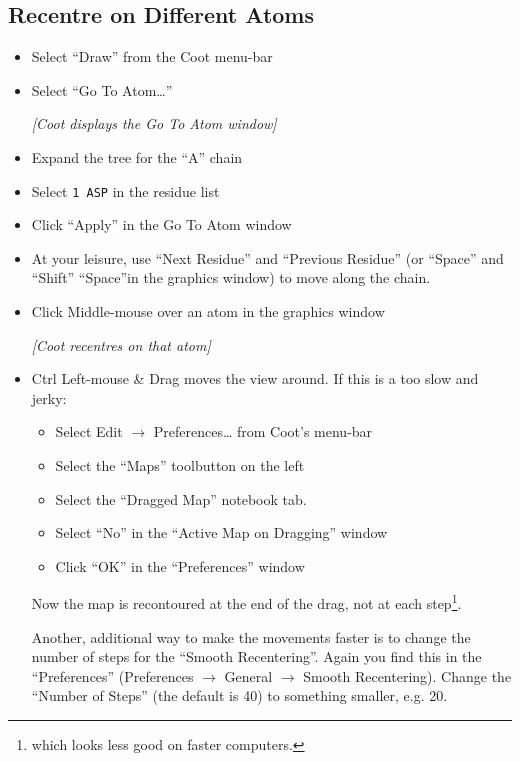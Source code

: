 \documentclass{article}
\begin{document}
\subsection {Recentre on Different Atoms}
\begin{itemize}
\item Select \textsf{``Draw''} from the Coot menu-bar
\item Select \textsf{``Go To Atom\ldots''}

\textsl{  [Coot displays the Go To Atom window]}

\item Expand the tree for the ``A'' chain
\item Select \texttt{1 ASP} in the residue list
\item Click \textsf{``Apply''} in the Go To Atom window
  
\item At your leisure, use \textsf{``Next Residue''} and
  \textsf{``Previous Residue''} (or ``Space'' and ``Shift''
  ``Space''in the graphics window) to move along the chain.


\item Click Middle-mouse over an atom in the graphics window

\textsl{[Coot recentres on that atom]}

\item Ctrl Left-mouse \& Drag moves the view around.  If this is a too
  slow and jerky:
  \begin{itemize}
  \item Select \textsf{Edit $\rightarrow$ Preferences\ldots} from Coot's menu-bar
  \item Select the \textsf{``Maps''} toolbutton on the left
  \item Select the \textsf{``Dragged Map''} notebook tab.
  \item Select \textsf{``No''} in the ``Active Map on Dragging'' window
  \item Click \textsf{``OK''} in the ``Preferences'' window
  \end{itemize}
  Now the map is recontoured at the end of the drag, not at each
  step\footnote{which looks less good on faster computers.}.

  Another, additional way to make the movements faster is to change the 
  number of steps for the ``Smooth Recentering''. Again you find this in
  the ``Preferences'' (\textsf{Preferences $\rightarrow$ General $\rightarrow$ 
  Smooth Recentering}). Change the \textsf{``Number of Steps''} (the 
  default is 40) to something smaller, e.g. 20.



\end{itemize}
\end{document}

